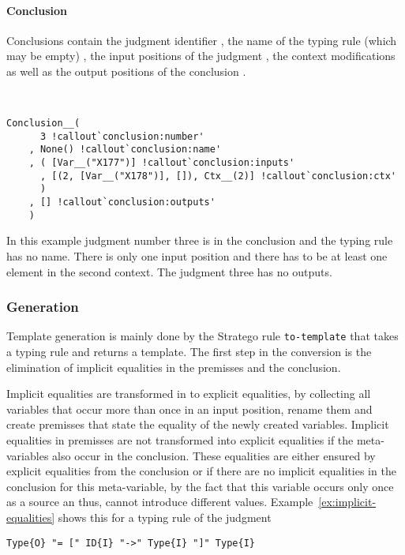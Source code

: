 \paragraph{Conclusion}
Conclusions contain the judgment identifier
, the name of the typing rule (which may
be empty) , the input positions of the
judgment , the context modifications
 as well as the output positions of the
conclusion .

\begin{example}{~}
\begin{verbatim}
Conclusion__(
      3 !callout`conclusion:number'
    , None() !callout`conclusion:name'
    , ( [Var__("X177")] !callout`conclusion:inputs'
      , [(2, [Var__("X178")], []), Ctx__(2)] !callout`conclusion:ctx'
      )
    , [] !callout`conclusion:outputs'
    )
\end{verbatim}
\end{example}

In this example judgment number three is in the conclusion and the
typing rule has no name. There is only one input position and there
has to be at least one element in the second context. The judgment
three has no outputs.

\subsubsection{Generation}
Template generation is mainly done by the Stratego rule
\verb|to-template| that takes a typing rule and returns a
template. The first step in the conversion is the elimination of
implicit equalities in the premisses and the conclusion.

Implicit equalities are transformed in to explicit equalities, by
collecting all variables that occur more than once in an input
position, rename them and create premisses that state the equality of
the newly created variables. Implicit equalities in premisses are not
transformed into explicit equalities if the meta-variables also occur
in the conclusion. These equalities are either ensured by explicit
equalities from the conclusion or if there are no implicit equalities
in the conclusion for this meta-variable, by the fact that this
variable occurs only once as a source an thus, cannot introduce
different values. Example~\ref{ex:implicit-equalities} shows this for
a typing rule of the judgment

\begin{verbatim}
Type{O} "= [" ID{I} "->" Type{I} "]" Type{I}
\end{verbatim}

